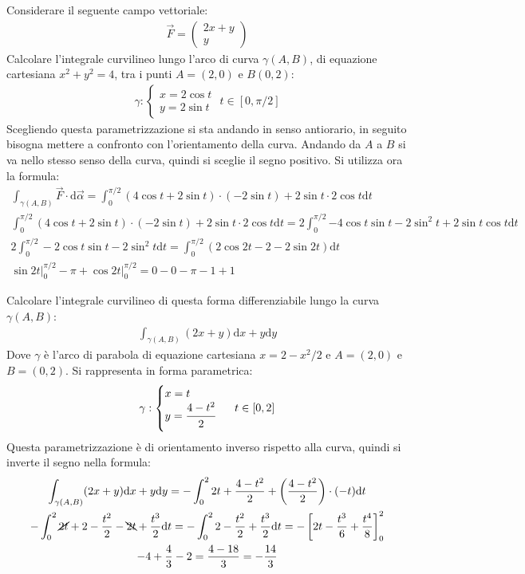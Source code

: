 \documentclass{article}
\newcommand{\df}{\mathrm{d}}
\numberwithin{equation}{subsection}
\begin{document}
Considerare il seguente campo vettoriale:
\begin{gather*}
    \vec{F}=\begin{pmatrix}
        2x+y\\y
    \end{pmatrix}
\end{gather*}
Calcolare l'integrale curvilineo lungo l'arco di curva $\gamma(A,B)$, di equazione cartesiana $x^2+y^2=4$, tra i punti $A=(2,0)$ e $B(0,2)$:
\begin{gather*}
    \gamma:\begin{cases}
        x=2\cos t\\y=2\sin t
    \end{cases}\,\, t\in[0,\pi/2]
\end{gather*}
Scegliendo questa parametrizzazione si sta andando in senso antiorario, in seguito bisogna mettere a confronto con l'orientamento della curva. Andando da $A$ a $B$ si va nello stesso senso della curva, quindi si sceglie il segno positivo. Si utilizza ora la formula:
\begin{gather*}
    \int_{\gamma(A,B)}\vec{F}\cdot\df\vec{\alpha}=\int_{0}^{\pi/2}(4\cos t+2\sin t)\cdot(-2\sin t)+2\sin t\cdot2\cos t\df t\\
    \int_{0}^{\pi/2}(4\cos t+2\sin t)\cdot(-2\sin t)+2\sin t\cdot2\cos t\df t=
    2\int_0^{\pi/2}{-4\cos t\sin t}-2\sin^2t+2\sin t\cos t\df t\\
    2\int_0^{\pi/2}-2\cos t\sin t-2\sin^2t\df t=
    \int_0^{\pi/2}(2\cos2t-2-2\sin2t)\df t\\
    \sin 2t\bigg|_0^{\pi/2}-\pi+\cos2t\bigg|_0^{\pi/2}=0-0-\pi-1+1
\end{gather*}



Calcolare l'integrale curvilineo di questa forma differenziabile lungo la curva $\gamma(A,B)$:
\begin{gather*}
    \int_{\gamma(A,B)}(2x+y)\df x+y\df y
\end{gather*}
Dove $\gamma$ è l'arco di parabola di equazione cartesiana $x=2-x^2/2$ e $A=(2,0)$ e $B=(0,2)$. Si rappresenta in forma parametrica:
\begin{gather*}
    \gamma:\begin{cases}
        x=t\\y=\displaystyle\frac{\strut 4-t^2}{\strut2}
    \end{cases}\,\, t\in[0,2]
\end{gather*}
Questa parametrizzazione è di orientamento inverso rispetto alla curva, quindi si inverte il segno nella formula:
\begin{gather*}
    \int_{\gamma(A,B)}(2x+y)\df x+y\df y=-\int_0^22t+\frac{4-t^2}{2}+\left(\frac{4-t^2}{2}\right)\cdot(-t)\df t\\
    -\int_0^2\cancel{2t}+2-\frac{t^2}{2}-\bcancel{2t}+\frac{t^3}{2}\df t=-\int_0^22-\frac{t^2}{2}+\frac{t^3}{2}\df t=-\left[2t-\frac{t^3}{6}+\frac{t^4}{8}\right]_0^2\\
    -4+\frac{4}{3}-2=\frac{4-18}{3}=-\frac{14}{3}
\end{gather*}
\end{document}
